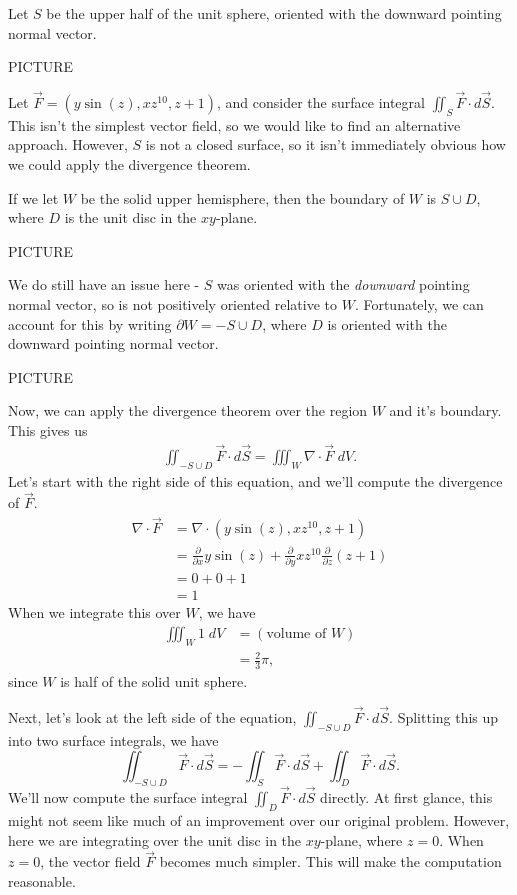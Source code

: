 \documentclass{ximera}
\begin{document}
\begin{example}
Let $S$ be the upper half of the unit sphere, oriented with the downward pointing normal vector.

PICTURE

Let $\vec{F} = \left(y\sin(z), xz^10, z+1\right)$, and consider the surface integral $\iint_S\vec{F}\cdot d\vec{S}$. This isn't the simplest vector field, so we would like to find an alternative approach. However, $S$ is not a closed surface, so it isn't immediately obvious how we could apply the divergence theorem.

If we let $W$ be the solid upper hemisphere, then the boundary of $W$ is $S\cup D$, where $D$ is the unit disc in the $xy$-plane.

PICTURE

We do still have an issue here - $S$ was oriented with the \emph{downward} pointing normal vector, so is not positively oriented relative to $W$. Fortunately, we can account for this by writing $\partial W = -S\cup D$, where $D$ is oriented with the downward pointing normal vector.

PICTURE

Now, we can apply the divergence theorem over the region $W$ and it's boundary. This gives us
\begin{align*}
\iint_{-S\cup D} \vec{F}\cdot d\vec{S} = \iiint_W \nabla\cdot \vec{F}\;dV.
\end{align*}
Let's start with the right side of this equation, and we'll compute the divergence of $\vec{F}$.
\begin{align*}
\nabla\cdot \vec{F} &= \nabla \cdot \left(y\sin(z), xz^10, z+1\right)\\
&= \frac{\partial}{\partial x}y\sin(z) + \frac{\partial}{\partial y}xz^10 \frac{\partial}{\partial z} (z+1)\\
&= 0+0+1\\
&= 1
\end{align*}
When we integrate this over $W$, we have
\begin{align*}
\iiint_W 1\;dV &= (\text{volume of }W)\\
&= \frac{2}{3}\pi,
\end{align*}
since $W$ is half of the solid unit sphere.

Next, let's look at the left side of the equation, $\iint_{-S\cup D} \vec{F}\cdot d\vec{S}$. Splitting this up into two surface integrals, we have
\[
\iint_{-S\cup D} \vec{F}\cdot d\vec{S} = -\iint_S\vec{F}\cdot d\vec{S} + \iint_D\vec{F}\cdot d\vec{S}.
\]
We'll now compute the surface integral $\iint_D\vec{F}\cdot d\vec{S}$ directly. At first glance, this might not seem like much of an improvement over our original problem. However, here we are integrating over the unit disc in the $xy$-plane, where $z=0$. When $z=0$, the vector field $\vec{F}$ becomes much simpler. This will make the computation reasonable.


\end{example}
\end{document}
